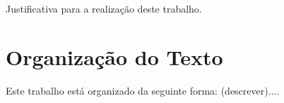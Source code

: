 Justificativa para a realização deste trabalho.

\section{Organização do Texto}

Este trabalho está organizado da seguinte forma: (descrever)....










